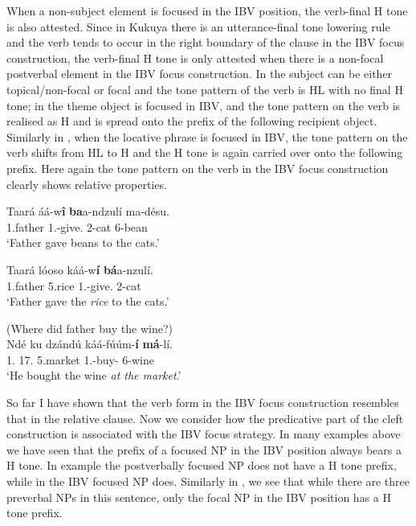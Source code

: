 \documentclass[output=paper,colorlinks,citecolor=brown,
]{langscibook}
\begin{document}
When a non-subject element is focused in the IBV position, the verb-final H tone is also attested. Since in Kukuya there is an utterance-final tone lowering rule and the verb tends to occur in the right boundary of the clause in the IBV focus construction, the verb-final H tone is only attested when there is a non-focal postverbal element in the IBV focus construction. In  the subject can be either topical/non-focal or focal and the tone pattern of the verb is HL with no final H tone; in  the theme object is focused in IBV, and the tone pattern on the verb is realised as H and is spread onto the prefix of the following recipient object. Similarly in , when the locative phrase is focused in IBV, the tone pattern on the verb shifts from HL to H and the H tone is again carried over onto the following prefix. Here again the tone pattern on the verb in the IBV focus construction clearly shows relative properties.
\begin{exe}
    \ex \label{150}
    \begin{xlist}
\ex
\label{150a}
\gll
Taará áá-w\textbf{î} \textbf{ba}a-ndzulí ma-désu.\\
1.father 1\Sm{}.\Pst{}-give.\Pst{} 2-cat 6-bean\\
\trans ‘Father gave beans to the cats.’

\ex
\label{150b}
\gll
Taará lóoso káá-w\textbf{í} \textbf{bá}a-nzulí.\\
1.father 5.rice 1\Sm{}.\Pst{}-give.\Pst{} 2-cat\\
\trans ‘Father gave the \textit{rice} to the cats.’

    \end{xlist}
\end{exe}
\begin{exe}
\ex
\label{151}
 (Where did father buy the wine?) \\
\gll
Ndé ku dzándú káá-fúúm-\textbf{í} \textbf{má}-lí.\\
1.\Pro{} 17.\Loc{} 5.market 1\Sm{}.\Pst{}-buy-\Pst{} 6-wine\\
\trans ‘He bought the wine \textit{at the market}.’

\end{exe}
So far I have shown that the verb form in the IBV focus construction resembles that in the relative clause. Now we consider how the predicative part of the cleft construction is associated with the IBV focus strategy. In many examples above we have seen that the prefix of a focused NP in the IBV position always bears a H tone. In example  the postverbally focused NP does not have a H tone prefix, while in  the IBV focused NP does. Similarly in , we see that while there are three preverbal NPs in this sentence, only the focal NP in the IBV position has a H tone prefix.
\end{document}
